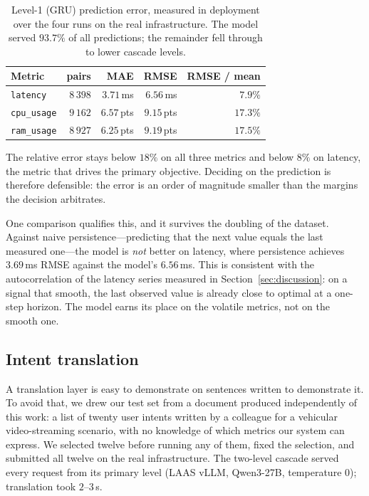 \documentclass[conference]{IEEEtran}
\begin{document}
\begin{table}[t]
\centering
\caption{Level-1 (GRU) prediction error, measured in deployment over the
four runs on the real infrastructure. The model served $93.7\%$ of all
predictions; the remainder fell through to lower cascade levels.}
\label{tab:mlacc}
\footnotesize
\begin{tabular}{@{}lrrrr@{}}
\toprule
\textbf{Metric} & \textbf{pairs} & \textbf{MAE} & \textbf{RMSE}
& \textbf{RMSE / mean}\\
\midrule
\texttt{latency}   & $8\,398$ & $3.71$\,ms  & $6.56$\,ms  & $7.9\%$\\
\texttt{cpu\_usage}  & $9\,162$ & $6.57$\,pts & $9.15$\,pts & $17.3\%$\\
\texttt{ram\_usage}  & $8\,927$ & $6.25$\,pts & $9.19$\,pts & $17.5\%$\\
\bottomrule
\end{tabular}
\end{table}

The relative error stays below $18\%$ on all three metrics and below $8\%$ on
latency, the metric that drives the primary objective. Deciding on the
prediction is therefore defensible: the error is an order of magnitude
smaller than the margins the decision arbitrates.

One comparison qualifies this, and it survives the doubling of the dataset.
Against naive persistence---predicting that the next value equals the last
measured one---the model is \emph{not} better on latency, where persistence
achieves $3.69$\,ms RMSE against the model's $6.56$\,ms.
This is consistent with the autocorrelation of the latency series measured in
Section~\ref{sec:discussion}: on a signal that smooth, the last observed
value is already close to optimal at a one-step horizon. The model earns its
place on the volatile metrics, not on the smooth one.

\subsection{Intent translation}
\label{sec:intenteval}

A translation layer is easy to demonstrate on sentences written to
demonstrate it. To avoid that, we drew our test set from a document produced
independently of this work: a list of twenty user intents written by a
colleague for a vehicular video-streaming scenario, with no knowledge of
which metrics our system can express. We selected twelve before running any
of them, fixed the selection, and submitted all twelve on the real
infrastructure. The two-level cascade served every request from its primary
level (LAAS vLLM, Qwen3-27B, temperature $0$); translation took $2$--$3$\,s.
\end{document}

